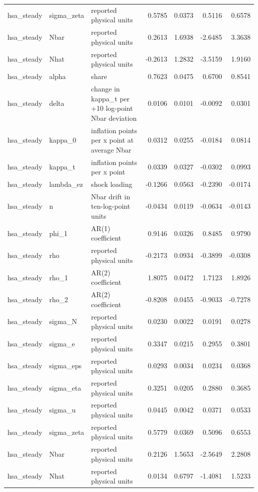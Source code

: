 \begin{tabular}{lllrrrr}
hsa\_steady & sigma\_zeta & reported physical units & 0.5785 & 0.0373 & 0.5116 & 0.6578 \\
hsa\_steady & Nbar & reported physical units & 0.2613 & 1.6938 & -2.6485 & 3.3638 \\
hsa\_steady & Nhat & reported physical units & -0.2613 & 1.2832 & -3.5159 & 1.9160 \\
hsa\_steady & alpha & share & 0.7623 & 0.0475 & 0.6700 & 0.8541 \\
hsa\_steady & delta & change in kappa\_t per +10 log-point Nbar deviation & 0.0106 & 0.0101 & -0.0092 & 0.0301 \\
hsa\_steady & kappa\_0 & inflation points per x point at average Nbar & 0.0312 & 0.0255 & -0.0184 & 0.0814 \\
hsa\_steady & kappa\_t & inflation points per x point & 0.0339 & 0.0327 & -0.0302 & 0.0993 \\
hsa\_steady & lambda\_ez & shock loading & -0.1266 & 0.0563 & -0.2390 & -0.0174 \\
hsa\_steady & n & Nbar drift in ten-log-point units & -0.0434 & 0.0119 & -0.0634 & -0.0143 \\
hsa\_steady & phi\_1 & AR(1) coefficient & 0.9146 & 0.0326 & 0.8485 & 0.9790 \\
hsa\_steady & rho & reported physical units & -0.2173 & 0.0934 & -0.3899 & -0.0308 \\
hsa\_steady & rho\_1 & AR(2) coefficient & 1.8075 & 0.0472 & 1.7123 & 1.8926 \\
hsa\_steady & rho\_2 & AR(2) coefficient & -0.8208 & 0.0455 & -0.9033 & -0.7278 \\
hsa\_steady & sigma\_N & reported physical units & 0.0230 & 0.0022 & 0.0191 & 0.0278 \\
hsa\_steady & sigma\_e & reported physical units & 0.3347 & 0.0215 & 0.2955 & 0.3801 \\
hsa\_steady & sigma\_eps & reported physical units & 0.0293 & 0.0034 & 0.0234 & 0.0368 \\
hsa\_steady & sigma\_eta & reported physical units & 0.3251 & 0.0205 & 0.2880 & 0.3685 \\
hsa\_steady & sigma\_u & reported physical units & 0.0445 & 0.0042 & 0.0371 & 0.0533 \\
hsa\_steady & sigma\_zeta & reported physical units & 0.5779 & 0.0369 & 0.5096 & 0.6553 \\
hsa\_steady & Nbar & reported physical units & 0.2126 & 1.5653 & -2.5649 & 2.2808 \\
hsa\_steady & Nhat & reported physical units & 0.0134 & 0.6797 & -1.4081 & 1.5233 \\

\end{tabular}
